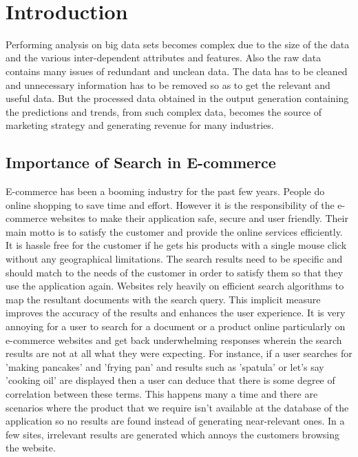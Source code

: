 \documentclass{sig-alternate-05-2015}
\begin{document}
\\


\section{Introduction}
Performing analysis on big data sets becomes complex due to the size of the data and the various inter-dependent attributes and features. Also the raw data contains many issues of redundant and unclean data. The data has to be cleaned and unnecessary information has to be removed so as to get the relevant and useful data. But the processed data obtained in the output generation containing the predictions and trends, from such complex data, becomes the source of marketing strategy and generating revenue for many industries.
\newline 

\subsection{Importance of Search in E-commerce}
E-commerce has been a booming industry for the past few years. People do online shopping to save time and effort. However it is the responsibility of the e-commerce websites to make their application safe, secure and user friendly. Their main motto is to satisfy the customer and provide the online services efficiently.\\
It is hassle free for the customer if he gets his products with a single mouse click without any geographical limitations. The search results need to be specific and should match to the needs of the customer in order to satisfy them so that they use the application again. Websites rely heavily on efficient search algorithms to map the resultant documents with the search query. This implicit measure improves the accuracy of the results and enhances the user experience. It is very annoying for a user to search for a document or a product online particularly on e-commerce websites and get back underwhelming responses wherein the search results are not at all what they were expecting. For instance, if a user searches for 'making pancakes' and 'frying pan' and results such as 'spatula' or let's say 'cooking oil' are displayed then a user can deduce that there is some degree of correlation between these terms. This happens many a time and there are scenarios where the product that we require isn't available at the database of the application so no results are found instead of generating near-relevant ones. In a few sites, irrelevant results are generated which annoys the customers browsing the website.
\newline 
\end{document}
